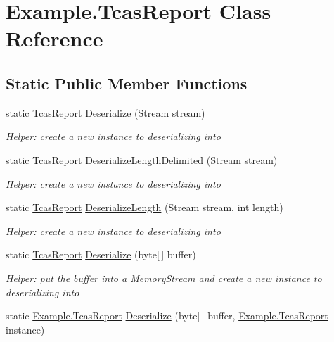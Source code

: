 \hypertarget{class_example_1_1_tcas_report}{}\section{Example.\+Tcas\+Report Class Reference}
\label{class_example_1_1_tcas_report}
\subsection*{Static Public Member Functions}
\begin{DoxyCompactItemize}
\item 
static \hyperlink{class_example_1_1_tcas_report}{Tcas\+Report} \hyperlink{class_example_1_1_tcas_report_a226662cf1becc0b4e5c94bb677fe3cb7}{Deserialize} (Stream stream)
\begin{DoxyCompactList}\small\item\em Helper\+: create a new instance to deserializing into\end{DoxyCompactList}\item 
static \hyperlink{class_example_1_1_tcas_report}{Tcas\+Report} \hyperlink{class_example_1_1_tcas_report_a11671313adb628266647791e54f33566}{Deserialize\+Length\+Delimited} (Stream stream)
\begin{DoxyCompactList}\small\item\em Helper\+: create a new instance to deserializing into\end{DoxyCompactList}\item 
static \hyperlink{class_example_1_1_tcas_report}{Tcas\+Report} \hyperlink{class_example_1_1_tcas_report_aafbcd33afecb9bc0511bdb14f0121dd0}{Deserialize\+Length} (Stream stream, int length)
\begin{DoxyCompactList}\small\item\em Helper\+: create a new instance to deserializing into\end{DoxyCompactList}\item 
static \hyperlink{class_example_1_1_tcas_report}{Tcas\+Report} \hyperlink{class_example_1_1_tcas_report_a95a21b26286e534445e670310b216a15}{Deserialize} (byte\mbox{[}$\,$\mbox{]} buffer)
\begin{DoxyCompactList}\small\item\em Helper\+: put the buffer into a Memory\+Stream and create a new instance to deserializing into\end{DoxyCompactList}\item 
static \hyperlink{class_example_1_1_tcas_report}{Example.\+Tcas\+Report} \hyperlink{class_example_1_1_tcas_report_a75d7b4ddbb76dd34dd8f5389a4b78f5a}{Deserialize} (byte\mbox{[}$\,$\mbox{]} buffer, \hyperlink{class_example_1_1_tcas_report}{Example.\+Tcas\+Report} instance)

\end{DoxyCompactItemize}
